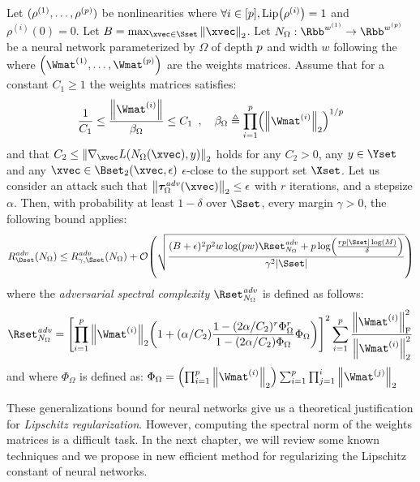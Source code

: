 \begin{theorem}
  Let $(\rho^{(1)}, \dots, \rho^{(p)})$ be nonlinearities where $\forall i \in [\depth], \lip{\rho^{(i)}} = 1$ and $\rho^{(i)}(0) = 0$.
  Let $B = \max_{\xvec \in \Sset} \norm{\xvec}_2$.
  Let $N_\Omega: \Rbb^{w^{(1)}} \rightarrow \Rbb^{w^{(\depth)}}$ be a neural network parameterized by $\Omega$ of depth $p$ and width $w$ following the~ where $\left( \Wmat^{(1)}, \dots, \Wmat^{(\depth)} \right)$ are the weights matrices.
  Assume that for a constant $C_1 \geq 1$ the weights matrices satisfies:
  \begin{equation}
    \frac{1}{C_1} \leq \frac{\norm{\Wmat^{(i)}}}{\beta_\Omega} \leq C_1 \enspace, \quad \beta_\Omega \triangleq \prod_{i=1}^\depth \left(\norm{\Wmat^{(i)}}_2\right)^{1/\depth}
  \end{equation}
  and that $C_2 \leq \norm{\nabla_\xvec L(N_\Omega(\xvec), y)}_2$ holds for any $C_2 > 0$, any $y \in \Yset$ and any $\xvec \in \Bset_2(\xvec, \epsilon)$ $\epsilon$-close to the support set $\Xset$.
  Let us consider an attack such that $\norm{\adv^{\text{\emph{adv}}}_\Omega(\xvec)}_2 \leq \epsilon$ with $r$ iterations, and a stepsize $\alpha$.
  Then, with probability at least $1 - \delta$ over $\Sset$, every margin $\gamma > 0$, the following bound applies:
  \begin{equation}
    R_\Dset^{\text{\emph{adv}}}(N_\Omega) \leq R_{\gamma, \Sset}^{\text{\emph{adv}}}(N_\Omega) + \bigO \left( \sqrt{\frac{(B + \epsilon)^2 \depth^2 w \log(\depth w) \Rset^{\text{\emph{adv}}}_{N_\Omega} + \depth \log(\frac{r \depth |\Sset| \log(M)}{\delta})}{\gamma^2 |\Sset|}} \right)
  \end{equation}
  where the \emph{adversarial spectral complexity} $\Rset^{\text{\emph{adv}}}_{N_\Omega}$ is defined as follows:
  \begin{equation}
    \Rset^{\text{\emph{adv}}}_{N_\Omega} = \left[ \prod_{i=1}^\depth \norm{\Wmat^{(i)}}_2 \left( 1 + (\alpha / C_2) \frac{1 - (2\alpha/C_2)^r \Phi_\Omega^r }{1 - (2\alpha/C_2) \Phi_\Omega } \Phi_\Omega  \right) \right]^2 \sum_{i = 1}^\depth \frac{\norm{\Wmat^{(i)}}_\fro^2}{\norm{\Wmat^{(i)}}_2^2}
  \end{equation}
  and where $\Phi_\Omega$ is defined as: $\Phi_\Omega = \left(\prod_{i=1}^\depth \norm{\Wmat^{(i)}}_2 \right) \sum_{i=1}^\depth \prod_{j=1}^{i} \norm{\Wmat^{(j)}}_2$
\end{theorem}

These generalizations bound for neural networks give us a theoretical justification for \emph{Lipschitz regularization}.
However, computing the spectral norm of the weights matrices is a difficult task.
In the next chapter, we will review some known techniques and we propose in  new efficient method for regularizing the Lipschitz constant of neural networks.






